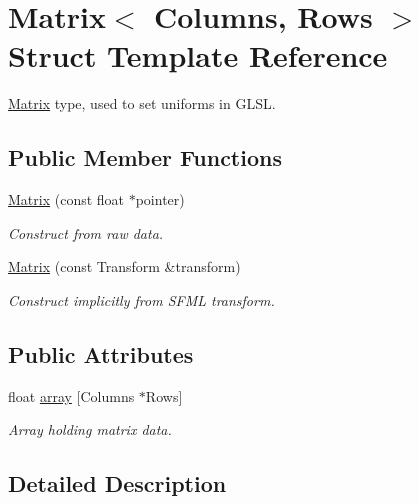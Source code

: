 \hypertarget{struct_matrix}{}\section{Matrix$<$ Columns, Rows $>$ Struct Template Reference}
\label{struct_matrix}


\mbox{\hyperlink{struct_matrix}{Matrix}} type, used to set uniforms in G\+L\+SL.  


\subsection*{Public Member Functions}
\begin{DoxyCompactItemize}
\item 
\mbox{\hyperlink{struct_matrix_ad40da72f526bcd6854d83496d2f62e01}{Matrix}} (const float $\ast$pointer)
\begin{DoxyCompactList}\small\item\em Construct from raw data. \end{DoxyCompactList}\item 
\mbox{\hyperlink{struct_matrix_acc8ec3ddfe33a01f9ae7970d8fed9855}{Matrix}} (const Transform \&transform)
\begin{DoxyCompactList}\small\item\em Construct implicitly from S\+F\+ML transform. \end{DoxyCompactList}\end{DoxyCompactItemize}
\subsection*{Public Attributes}
\begin{DoxyCompactItemize}
\item 
\mbox{\label{struct_matrix_a494cc3a7a34398ec21992ba83018d9f4}} 
float \mbox{\hyperlink{struct_matrix_a494cc3a7a34398ec21992ba83018d9f4}{array}} \mbox{[}Columns $\ast$Rows\mbox{]}
\begin{DoxyCompactList}\small\item\em Array holding matrix data. \end{DoxyCompactList}\end{DoxyCompactItemize}


\subsection{Detailed Description}
